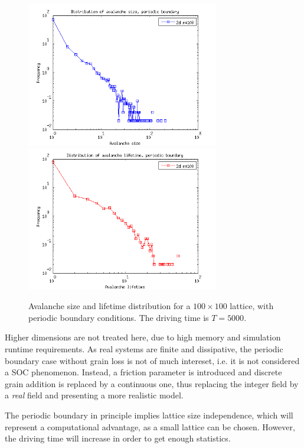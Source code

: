 \begin{figure} 
\begin{center}
\includegraphics[width=0.75\textwidth]{results/sp.png} \\
\includegraphics[width=0.75\textwidth]{results/tp.png} 
\caption{Avalanche size and lifetime distribution for a $100\times100$ lattice, with periodic boundary conditions. 
The driving time is $T=5000$.  }
\label{sp}
\end{center}
\end{figure} 

Higher dimensions are not treated here, due to high memory and simulation runtime requirements. As real systems are finite and dissipative, the periodic boundary case without grain loss is not of much intereset, i.e. it is not considered a SOC phenomenon. Instead, a friction parameter is introduced and discrete grain addition is replaced by a continuous one, thus replacing the integer field by a \emph{real} field and presenting a more realistic model.

The periodic boundary in principle implies lattice size independence, which will represent a computational advantage, as a small lattice can be chosen. However, the driving time will increase in order to get enough statistics.

